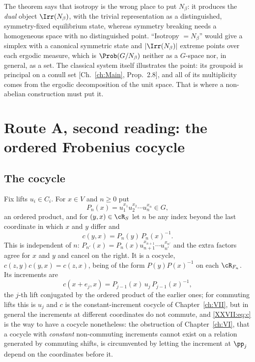 \begin{remark}
The theorem says that isotropy is the wrong place to put $N_\beta$: it produces the
\emph{dual} object $\Irr(N_\beta)$, with the trivial representation as a distinguished,
symmetry-fixed equilibrium state, whereas symmetry breaking needs a homogeneous space
with no distinguished point. ``Isotropy $=N_\beta$'' would give a simplex with a canonical
symmetric state and $|\Irr(N_\beta)|$ extreme points over each ergodic measure, which is
$\Prob(G/N_\beta)$ neither as a $G$-space nor, in general, as a set. The classical system
itself illustrates the point: its groupoid is principal on a conull set
[Ch.~\ref{ch:Main}, Prop.~2.8], and all of its multiplicity comes from the ergodic decomposition
of the unit space. That is where a non-abelian construction must put it.
\end{remark}

\section{Route A, second reading: the ordered Frobenius cocycle}\label{XXVII:sec:ordered}

\subsection{The cocycle}

Fix lifts $u_i\in C_i$. For $x\in V$ and $n\ge0$ put
\begin{equation}\label{XXVII:eq:Pn}
P_n(x)=u_1^{x_1}u_2^{x_2}\cdots u_n^{x_n}\in G,
\end{equation}
an ordered product, and for $(y,x)\in\cR_S$ let $n$ be any index beyond the last coordinate
in which $x$ and $y$ differ and
\begin{equation}\label{XXVII:eq:c}
c(y,x)=P_n(y)\,P_n(x)^{-1}.
\end{equation}
This is independent of $n$: $P_{n'}(x)=P_n(x)u_{n+1}^{x_{n+1}}\cdots u_{n'}^{x_{n'}}$ and the
extra factors agree for $x$ and $y$ and cancel on the right. It is a cocycle,
$c(z,y)c(y,x)=c(z,x)$, being of the form $P(y)P(x)^{-1}$ on each $\cR_{F_n}$. Its
increments are
\begin{equation}\label{XXVII:eq:incr}
c(x+e_j,x)=P_{j-1}(x)\,u_j\,P_{j-1}(x)^{-1},
\end{equation}
the $j$-th lift conjugated by the ordered product of the earlier ones; for commuting lifts
this is $u_j$ and $c$ is the constant-increment cocycle of Chapter~\ref{ch:VII}, but in general the
increments at different coordinates do not commute, and \eqref{XXVII:eq:c} is the way to have a
cocycle nonetheless: the obstruction of Chapter~\ref{ch:VI}, that a cocycle with \emph{constant}
non-commuting increments cannot exist on a relation generated by commuting shifts, is
circumvented by letting the increment at $\pp_j$ depend on the coordinates before it.

